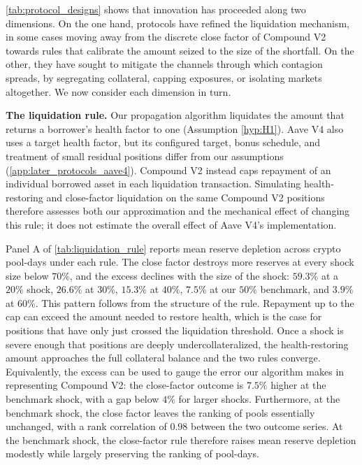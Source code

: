 \documentclass[a4paper,UKenglish,cleveref, autoref, thm-restate]{informs3}
\newcommand{\rev}[1]{{\color{purple}#1}}
\DeclareRobustCommand{\latestrev}[1]{{\color{red}\hypersetup{linkcolor=red,citecolor=red,urlcolor=red}#1}}
\newcommand{\boldpara}[1]{\noindent\textbf{#1}\quad}
\begin{document}
\rev{\autoref{tab:protocol_designs} shows that innovation has
proceeded along two dimensions. On the one hand, protocols have
refined the liquidation mechanism, \latestrev{in some cases} moving away from the discrete close
factor of Compound V2 towards rules that calibrate the amount seized
to the size of the shortfall. On the other, they have sought to
mitigate the channels through which contagion spreads, by segregating
collateral, capping exposures, or isolating markets altogether. We
now consider each dimension in turn.}

\medskip

\label{sec:liquidation_rule}
\rev{\boldpara{The liquidation rule.}
Our propagation algorithm liquidates the amount that returns a
borrower's health factor to one (Assumption \ref{hyp:H1}). \latestrev{Aave V4 also uses a target health factor, but its configured target, bonus schedule, and treatment of small residual positions differ from our assumptions (\ref{app:later_protocols_aave4}). Compound V2 instead caps repayment of an individual borrowed asset in each liquidation transaction. Simulating health-restoring and close-factor liquidation on the same Compound V2 positions therefore assesses both our approximation and the mechanical effect of changing this rule; it does not estimate the overall effect of Aave V4's implementation.}}


\rev{Panel A of \autoref{tab:liquidation_rule} reports mean reserve
depletion across crypto pool-days under each rule. The close factor
destroys more reserves at every shock size below $70\%$, and the
excess declines with the size of the shock: $59.3\%$ at a $20\%$ shock, $26.6\%$ at
$30\%$, $15.3\%$ at $40\%$, $7.5\%$ at our $50\%$ benchmark, and
$3.9\%$ at $60\%$. This pattern follows from the structure of the
rule. \latestrev{Repayment up to the cap can exceed the amount needed to restore health}, which is the case for
positions that have only just crossed the liquidation threshold. Once
a shock is severe enough that positions are deeply undercollateralized,
the health-restoring amount approaches the full collateral balance and
the two rules converge. Equivalently, the excess can be used to gauge
the error our algorithm makes in representing Compound V2: \latestrev{the close-factor outcome is $7.5\%$ higher at the benchmark shock, with a gap below $4\%$ for larger shocks}. Furthermore, at the benchmark shock,
the close factor leaves the ranking of
pools essentially unchanged, with a rank correlation of $0.98$ between
the two outcome series. \latestrev{At the benchmark shock, the close-factor rule therefore raises mean reserve depletion modestly while largely preserving the ranking of pool-days.}}
\end{document}
